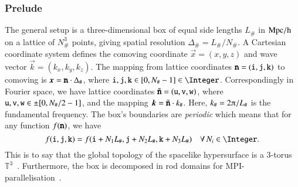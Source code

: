 






 
\subsubsection{Prelude} %


The general setup is a three-dimensional box of equal side lengths $L_\#$ in $\mathrm{Mpc/h}$ on a lattice of $N_\#^3$ points, giving spatial resolution $\Delta_\#=L_\#/N_\#$. %
A Cartesian coordinate system defines the comoving coordinate $\vec{x}=(x,y,z)$ and wave vector $\vec{k}=(k_x, k_y, k_z)$. The mapping from lattice coordinates $\boldsymbol{\mathtt{n}}= (\mathtt{i}, \mathtt{j}, \mathtt{k})$ to comoving is $\boldsymbol{x}=\boldsymbol{\mathtt{n}}\cdot  \Delta_\#$, where $\lcoord{i},\lcoord{j}, \lcoord{k}\in [0, N_\#-1]\in \Integer$. 
Correspondingly in Fourier space, we have lattice coordinates $\tilde{\boldsymbol{\mathtt{n}}} =(\mathtt{u}, \mathtt{v}, \mathtt{w})$, where $\mathtt{u}, \mathtt{v}, \mathtt{w} \in\pm[0, N_\#/2-1]$, and the mapping $\boldsymbol{k} =\tilde{\boldsymbol{\mathtt{n}}} \cdot k_\# $. Here,  $k_\#=2\ppi/L_\#$ is the fundamental frequency. 
The box's boundaries are \emph{periodic} which means that for any function $f(\boldsymbol{\mathtt{n}})$, we have
\begin{equation}\label{eq:PT:code:periodic_boundaries}
    f(\lcoord{i}, \lcoord{j}, \lcoord{k}) = f(\lcoord{i}+N_1 L_\#, \lcoord{j}+N_2 L_\#, \lcoord{k}+N_3 L_\# ) \quad\forall \,  N_i \in \Integer.
\end{equation}
This is to say that the global topology of the spacelike hypersurface is a 3-torus $\mathbb{T}^3$~\citep{adamekGevolutionCosmologicalNbody2016}. 
Furthermore, the box is decomposed in rod domains for MPI-parallelisation~\citep{daverioLatfield2LibraryClassical2016}.


